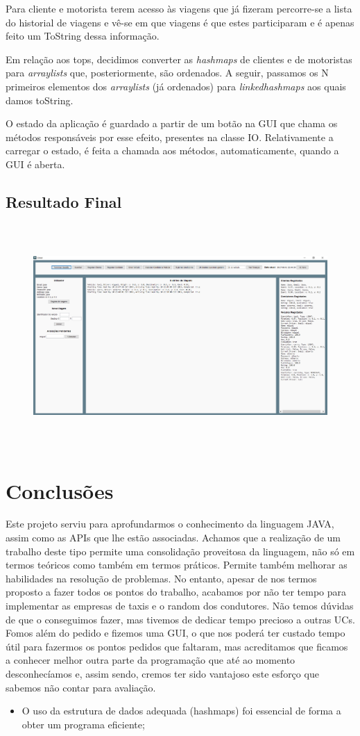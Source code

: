 \documentclass[a4paper]{article}
\begin{document}
Para cliente e motorista terem acesso às viagens que já fizeram percorre-se a lista do historial de viagens e vê-se em que viagens é que estes participaram e é apenas feito um ToString dessa informação.

Em relação aos tops, decidimos converter as \textit{hashmaps} de clientes e de motoristas para \textit{arraylists} que, posteriormente, são ordenados. A seguir, passamos os N primeiros elementos dos \textit{arraylists} (já ordenados) para \textit{linkedhashmaps} aos quais damos toString.

O estado da aplicação é guardado a partir de um botão na GUI que chama os métodos responsáveis por esse efeito, presentes na classe IO. Relativamente a carregar o estado, é feita a chamada aos métodos, automaticamente, quando a GUI é aberta.
\subsection{Resultado Final}
\begin{figure}[htbp]
    \centering
    \includegraphics[width = 420pt, height = 240pt]{gui}
\end{figure}

\section{Conclusões}
\label{sec:conclusao}
Este projeto serviu para aprofundarmos o conhecimento da linguagem JAVA, assim como as APIs que lhe estão associadas. Achamos que a realização de um trabalho deste tipo permite uma consolidação proveitosa da linguagem, não só em termos teóricos como também em termos práticos. Permite também melhorar as habilidades na resolução de problemas. No entanto, apesar de nos termos proposto a fazer todos os pontos do trabalho, acabamos por não ter tempo para implementar as empresas de taxis e o random dos condutores. Não temos dúvidas de que o conseguimos fazer, mas tivemos de dedicar tempo precioso a outras UCs. Fomos além do pedido e fizemos uma GUI, o que nos poderá ter custado tempo útil para fazermos os pontos pedidos que faltaram, mas acreditamos que ficamos a conhecer melhor outra parte da programação que até ao momento desconhecíamos e, assim sendo, cremos ter sido vantajoso este esforço que sabemos não contar para avaliação.

\begin{itemize}
        \item O uso da estrutura de dados adequada (hashmaps) foi essencial de forma a obter um programa eficiente;
\end{itemize}
\end{document}
